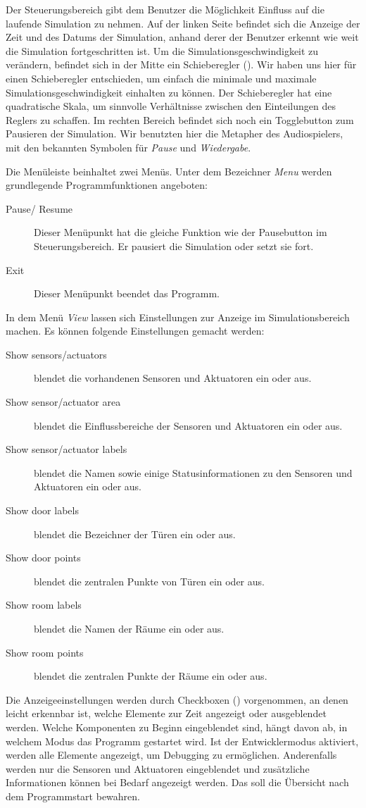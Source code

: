 Der Steuerungsbereich gibt dem Benutzer die Möglichkeit Einfluss auf die laufende Simulation zu nehmen. Auf der linken Seite befindet sich die Anzeige der Zeit und des Datums der Simulation, anhand derer der Benutzer erkennt wie weit die Simulation fortgeschritten ist. Um die Simulationsgeschwindigkeit zu verändern, befindet sich in der Mitte ein Schieberegler (). Wir haben uns hier für einen Schieberegler entschieden, um einfach die minimale und maximale Simulationsgeschwindigkeit einhalten zu können. Der Schieberegler hat eine quadratische Skala, um sinnvolle Verhältnisse zwischen den Einteilungen des Reglers zu schaffen. Im rechten Bereich befindet sich noch ein Togglebutton zum Pausieren der Simulation. Wir benutzten hier die Metapher des Audiospielers, mit den bekannten Symbolen für \emph{Pause} und \emph{Wiedergabe}.

Die Menüleiste beinhaltet zwei Menüs. Unter dem Bezeichner \emph{Menu} werden grundlegende Programmfunktionen angeboten:
\begin{description}

\item[Pause/ Resume] Dieser Menüpunkt hat die gleiche Funktion wie der Pausebutton im Steuerungsbereich. Er pausiert die Simulation oder setzt sie fort.

\item[Exit] Dieser Menüpunkt beendet das Programm.
\end{description}

In dem Menü \emph{View} lassen sich Einstellungen zur Anzeige im Simulationsbereich machen. Es können folgende Einstellungen gemacht werden:
\begin{description}
\item[Show sensors/actuators] blendet die vorhandenen Sensoren und Aktuatoren ein oder aus.
\item[Show sensor/actuator area] blendet die Einflussbereiche der Sensoren und Aktuatoren ein oder aus.
\item[Show sensor/actuator labels] blendet die Namen sowie einige Statusinformationen zu den Sensoren und Aktuatoren ein oder aus.
\item[Show door labels] blendet die Bezeichner der Türen ein oder aus.
\item[Show door points] blendet die zentralen Punkte von Türen ein oder aus.
\item[Show room labels] blendet die Namen der Räume ein oder aus.
\item[Show room points] blendet die zentralen Punkte der Räume ein oder aus.
\end{description}
Die Anzeigeeinstellungen werden durch Checkboxen () vorgenommen, an denen leicht erkennbar ist, welche Elemente zur Zeit angezeigt oder ausgeblendet werden. Welche Komponenten zu Beginn eingeblendet sind, hängt davon ab, in welchem Modus das Programm gestartet wird. Ist der Entwicklermodus aktiviert, werden alle Elemente angezeigt, um Debugging zu ermöglichen. Anderenfalls werden nur die Sensoren und Aktuatoren eingeblendet und zusätzliche Informationen können bei Bedarf angezeigt werden. Das soll die Übersicht nach dem Programmstart bewahren. 

